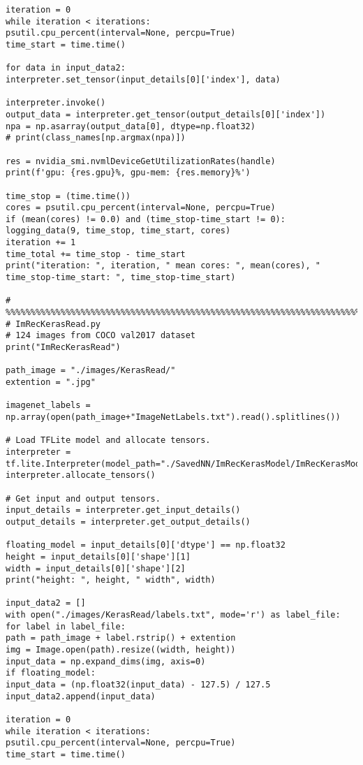 \begin{lstlisting}
iteration = 0
while iteration < iterations:
psutil.cpu_percent(interval=None, percpu=True)
time_start = time.time()

for data in input_data2:
interpreter.set_tensor(input_details[0]['index'], data)

interpreter.invoke()
output_data = interpreter.get_tensor(output_details[0]['index'])
npa = np.asarray(output_data[0], dtype=np.float32)
# print(class_names[np.argmax(npa)])

res = nvidia_smi.nvmlDeviceGetUtilizationRates(handle)
print(f'gpu: {res.gpu}%, gpu-mem: {res.memory}%')

time_stop = (time.time())
cores = psutil.cpu_percent(interval=None, percpu=True)
if (mean(cores) != 0.0) and (time_stop-time_start != 0):
logging_data(9, time_stop, time_start, cores)
iteration += 1
time_total += time_stop - time_start
print("iteration: ", iteration, " mean cores: ", mean(cores), " time_stop-time_start: ", time_stop-time_start)

# %%%%%%%%%%%%%%%%%%%%%%%%%%%%%%%%%%%%%%%%%%%%%%%%%%%%%%%%%%%%%%%%%%%%%%%%%%%%%%%%%%%%%%%
# ImRecKerasRead.py
# 124 images from COCO val2017 dataset
print("ImRecKerasRead")

path_image = "./images/KerasRead/"
extention = ".jpg"

imagenet_labels = np.array(open(path_image+"ImageNetLabels.txt").read().splitlines())

# Load TFLite model and allocate tensors.
interpreter = tf.lite.Interpreter(model_path="./SavedNN/ImRecKerasModel/ImRecKerasModel.tflite")
interpreter.allocate_tensors()

# Get input and output tensors.
input_details = interpreter.get_input_details()
output_details = interpreter.get_output_details()

floating_model = input_details[0]['dtype'] == np.float32
height = input_details[0]['shape'][1]
width = input_details[0]['shape'][2]
print("height: ", height, " width", width)

input_data2 = []
with open("./images/KerasRead/labels.txt", mode='r') as label_file:
for label in label_file:
path = path_image + label.rstrip() + extention
img = Image.open(path).resize((width, height))
input_data = np.expand_dims(img, axis=0)
if floating_model:
input_data = (np.float32(input_data) - 127.5) / 127.5
input_data2.append(input_data)

iteration = 0
while iteration < iterations:
psutil.cpu_percent(interval=None, percpu=True)
time_start = time.time()


\end{lstlisting}
